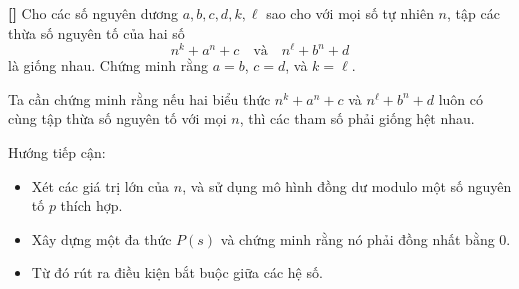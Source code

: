 \documentclass[../05-modular-arithmetic-a.tex]{subfiles}
\begin{document}
\begin{example*}\label{example:IRN-2015-MO-N4}\textbf{[]}
	Cho các số nguyên dương \( a, b, c, d, k, \ell \) sao cho với mọi số tự nhiên \( n \), tập các thừa số nguyên tố của hai số
	\[
		n^k + a^n + c \quad \text{và} \quad n^\ell + b^n + d
	\]
	là giống nhau. Chứng minh rằng \( a = b \), \( c = d \), và \( k = \ell \).
\end{example*}

\begin{story*}
    Ta cần chứng minh rằng nếu hai biểu thức \( n^k + a^n + c \) và \( n^\ell + b^n + d \) luôn có cùng tập thừa số nguyên tố với mọi \( n \), thì các tham số phải giống hệt nhau.

    Hướng tiếp cận:
    \begin{itemize}[topsep=0pt, partopsep=0pt, itemsep=0pt]
        \item Xét các giá trị lớn của \( n \), và sử dụng mô hình đồng dư modulo một số nguyên tố \( p \) thích hợp.
        \item Xây dựng một đa thức \( P(s) \) và chứng minh rằng nó phải đồng nhất bằng 0.
        \item Từ đó rút ra điều kiện bắt buộc giữa các hệ số.
    \end{itemize}
\end{story*}

\bigbreak
\end{document}
